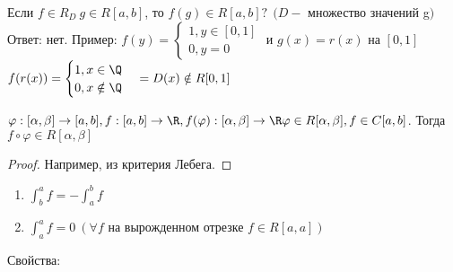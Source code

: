 \begin{Example}
	Если $f \in R_D \ g \in R[a, b]$, то $f(g) \in R[a,b]\text{?} \ \ (D -$ множество значений g$)$\\
	Ответ: нет. Пример: 
	$f(y) = 
	\begin{cases}
		1, y \in [0,1] \\
		0, y = 0
	\end{cases}$  и $g(x) = r(x)$ на $[0,1]$\\
	$f(r(x)) = 
	\begin{cases}
		1, x \in \Q \\
		0, x \notin \Q 
	\end{cases} = D(x) \notin R[0,1]$
\end{Example}

\begin{Thm}
	$\varphi: [\alpha, \beta] \to [a, b], f: [a,b] \to \R,\\ f(\varphi): [\alpha, \beta] \to \R\\
	\varphi \in R[\alpha, \beta], f \in C[a,b]$. Тогда $f \circ \varphi \in R[\alpha, \beta]$ 
\end{Thm} 

\begin{proof}
	Например, из критерия Лебега.
\end{proof}

\begin{enumerate}
	\item $\displaystyle \int_{b}^{a} f = - \int_{a}^{b} f$ 
	\item $\displaystyle \int_{a}^{a} f = 0 \ (\forall f \text{ на вырожденном отрезке } f \in R [a,a])$
\end{enumerate}

Свойства:

